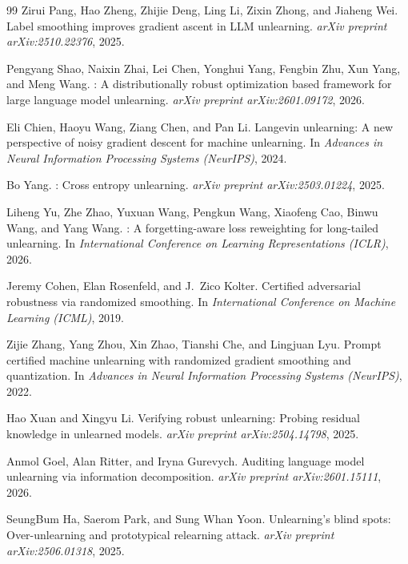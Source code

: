 \documentclass[11pt]{article}
\begin{document}
\begin{thebibliography}{99}
Zirui Pang, Hao Zheng, Zhijie Deng, Ling Li, Zixin Zhong, and Jiaheng Wei.
\newblock Label smoothing improves gradient ascent in {LLM} unlearning.
\newblock \emph{arXiv preprint arXiv:2510.22376}, 2025.

Pengyang Shao, Naixin Zhai, Lei Chen, Yonghui Yang, Fengbin Zhu, Xun Yang, and Meng Wang.
: A distributionally robust optimization based framework for large language model unlearning.
\newblock \emph{arXiv preprint arXiv:2601.09172}, 2026.

Eli Chien, Haoyu Wang, Ziang Chen, and Pan Li.
\newblock Langevin unlearning: A new perspective of noisy gradient descent for machine unlearning.
\newblock In \emph{Advances in Neural Information Processing Systems (NeurIPS)}, 2024.

Bo Yang.
: Cross entropy unlearning.
\newblock \emph{arXiv preprint arXiv:2503.01224}, 2025.

Liheng Yu, Zhe Zhao, Yuxuan Wang, Pengkun Wang, Xiaofeng Cao, Binwu Wang, and Yang Wang.
: A forgetting-aware loss reweighting for long-tailed unlearning.
\newblock In \emph{International Conference on Learning Representations (ICLR)}, 2026.

Jeremy Cohen, Elan Rosenfeld, and J.~Zico Kolter.
\newblock Certified adversarial robustness via randomized smoothing.
\newblock In \emph{International Conference on Machine Learning (ICML)}, 2019.

Zijie Zhang, Yang Zhou, Xin Zhao, Tianshi Che, and Lingjuan Lyu.
\newblock Prompt certified machine unlearning with randomized gradient smoothing and quantization.
\newblock In \emph{Advances in Neural Information Processing Systems (NeurIPS)}, 2022.

Hao Xuan and Xingyu Li.
\newblock Verifying robust unlearning: Probing residual knowledge in unlearned models.
\newblock \emph{arXiv preprint arXiv:2504.14798}, 2025.

Anmol Goel, Alan Ritter, and Iryna Gurevych.
\newblock Auditing language model unlearning via information decomposition.
\newblock \emph{arXiv preprint arXiv:2601.15111}, 2026.

SeungBum Ha, Saerom Park, and Sung Whan Yoon.
\newblock Unlearning's blind spots: Over-unlearning and prototypical relearning attack.
\newblock \emph{arXiv preprint arXiv:2506.01318}, 2025.


\end{thebibliography}
\end{document}
